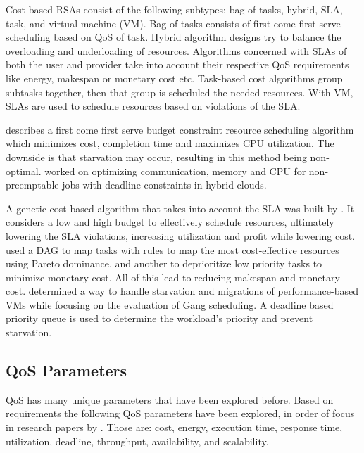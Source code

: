 \documentclass[12pt]{article}
\begin{document}
Cost based RSAs consist of the following subtypes: bag of tasks, hybrid, SLA, task, and virtual machine (VM). Bag of tasks consists of first come first serve scheduling based on QoS of task. Hybrid algorithm designs try to balance the overloading and underloading of resources. Algorithms concerned with SLAs of both the user and provider take into account their respective QoS requirements like energy, makespan or monetary cost etc. Task-based cost algorithms group subtasks together, then that group is scheduled the needed resources. With VM, SLAs are used to schedule resources based on violations of the SLA.

\textcite{ana2010} describes a first come first serve budget constraint resource scheduling algorithm which minimizes cost, completion time and maximizes CPU utilization. The downside is that starvation may occur, resulting in this  method being non-optimal.
\textcite{van2010cost} worked on optimizing communication, memory and CPU for non-preemptable jobs with deadline constraints in hybrid clouds.

A genetic cost-based algorithm that takes into account the SLA was built by \textcite{liu2013cost}. It considers a low and high budget to effectively schedule resources, ultimately lowering the SLA violations, increasing utilization and profit while lowering cost.
\textcite{su2013cost} used a DAG to map tasks with rules to map the most cost-effective resources using Pareto dominance, and another to deprioritize low priority tasks to minimize monetary cost. All of this lead to reducing makespan and monetary cost.
\textcite{ioannis2011cost} determined a way to handle starvation and migrations of performance-based VMs while focusing on the evaluation of Gang scheduling. A deadline based priority queue is used to determine the workload's priority and prevent starvation.



\subsection{QoS Parameters} \label{sub:schedQosParams}

QoS has many unique parameters that have been explored before. Based on requirements the following QoS parameters have been explored, in order of focus in research papers by \textcite{Singh2016}. Those are: cost, energy, execution time, response time, utilization, deadline, throughput, availability, and scalability.
\end{document}
